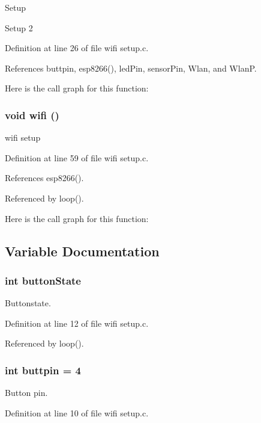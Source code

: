 Setup

Setup 2 

Definition at line 26 of file wifi setup.c.

References buttpin, esp8266(), led\-Pin, sensor\-Pin, Wlan, and Wlan\-P.

Here is the call graph for this function:
\subsubsection{\setlength{\rightskip}{0pt plus 5cm}void wifi ()}\label{wifi_01setup_8c_d0e9a40529b04928cb2dbd0a723a232f}


wifi setup 



Definition at line 59 of file wifi setup.c.

References esp8266().

Referenced by loop().

Here is the call graph for this function:

\subsection{Variable Documentation}
\subsubsection{\setlength{\rightskip}{0pt plus 5cm}int {\bf button\-State}}\label{wifi_01setup_8c_1a3b30f592b65e3d67bb202a9b4e5bd5}


Buttonstate. 



Definition at line 12 of file wifi setup.c.

Referenced by loop().
\subsubsection{\setlength{\rightskip}{0pt plus 5cm}int {\bf buttpin} = 4}\label{wifi_01setup_8c_f1d86e2438724cdc7cde89b4fa5e364a}


Button pin. 



Definition at line 10 of file wifi setup.c.

